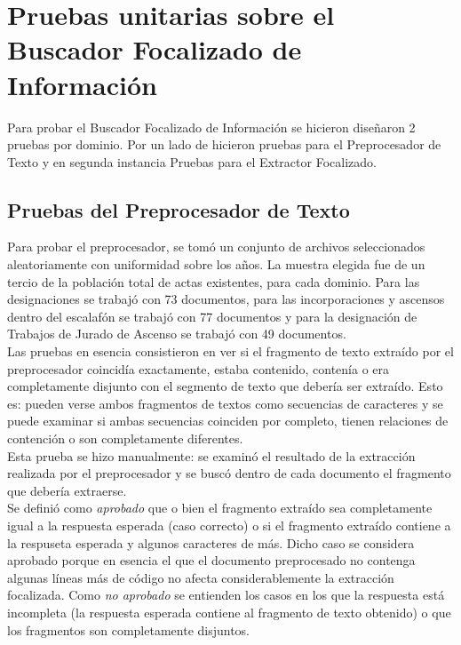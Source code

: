 \section{Pruebas unitarias sobre el Buscador Focalizado de Información}

Para probar el Buscador Focalizado de Información se hicieron diseñaron 2 pruebas por dominio. Por un lado de hicieron pruebas para el Preprocesador de Texto y en segunda instancia Pruebas para el Extractor Focalizado. 

\subsection{Pruebas del Preprocesador de Texto}

Para probar el preprocesador, se tomó un conjunto de archivos seleccionados aleatoriamente con uniformidad sobre los años. La muestra elegida fue de un tercio de la población total de actas existentes, para cada dominio. Para las designaciones se trabajó con 73 documentos, para las incorporaciones y ascensos dentro del escalafón se trabajó con 77 documentos y para la designación de Trabajos de Jurado de Ascenso se trabajó con 49 documentos. \\

Las pruebas en esencia consistieron en ver si el fragmento de texto extraído por el preprocesador coincidía exactamente, estaba contenido, contenía o era completamente disjunto con el segmento de texto que debería ser extraído. Esto es: pueden verse ambos fragmentos de textos como secuencias de caracteres y se puede examinar si ambas secuencias coinciden por completo, tienen relaciones de contención o son completamente diferentes. \\

Esta prueba se hizo manualmente: se examinó el resultado de la extracción realizada por el preprocesador y se buscó dentro de cada documento el fragmento que debería extraerse. \\

Se definió como \emph{aprobado} que o bien el fragmento extraído sea completamente igual a la respuesta esperada (caso correcto) o si el fragmento extraído contiene a la respuseta esperada y algunos caracteres de más. Dicho caso se considera aprobado porque en esencia el que el documento preprocesado no contenga algunas líneas más de código no afecta considerablemente la extracción focalizada. Como \emph{no aprobado} se entienden los casos en los que la respuesta está incompleta (la respuesta esperada contiene al fragmento de texto obtenido) o que los fragmentos son completamente disjuntos. \\

